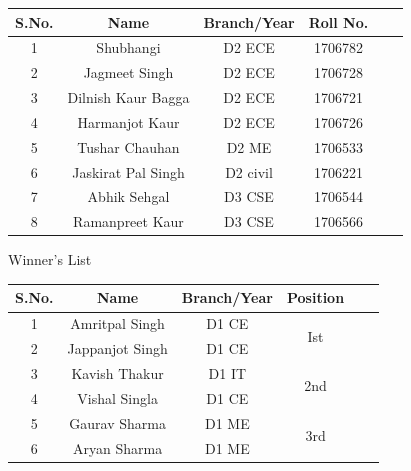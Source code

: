 \documentclass[12pt, a4 paper]{article}
\begin{document}
\begin{table}[h!]
  \begin{center}
    \begin{tabular}{|c|c|c|c|c|c|} 
    \toprule %
      \textbf{S.No.} & \textbf{Name} & \textbf{Branch/Year} & \textbf{Roll No.}\\
      \midrule %
      1 & Shubhangi & D2 ECE & 1706782 \\
      2 & Jagmeet Singh & D2 ECE & 1706728  \\
      3 & Dilnish Kaur Bagga & D2 ECE & 1706721  \\
      4 & Harmanjot Kaur & D2 ECE & 1706726 \\
      5 & Tushar Chauhan & D2 ME & 1706533 \\
      6 & Jaskirat Pal Singh & D2 civil & 1706221  \\
      7 & Abhik Sehgal & D3 CSE & 1706544 \\
      8 & Ramanpreet Kaur & D3 CSE  & 1706566 \\
      \bottomrule %
    \end{tabular}
  \end{center}
\end{table}


\begin{center}
\huge Winner's List
\end{center}

\begin{table}[h!]
  \begin{center}
    \begin{tabular}{|c|c|c|c|c|c|} 
    \toprule %
      \textbf{S.No.} & \textbf{Name} & \textbf{Branch/Year} & \textbf{Position} \\
      \midrule %
      1 & Amritpal Singh  & D1 CE & \multirow{2}{*}{Ist} \\
      2 & Jappanjot Singh & D1 CE \\
      \hline
      3 & Kavish Thakur   & D1 IT & \multirow{2}{*}{2nd} \\
      4 & Vishal Singla   & D1 CE \\
      \hline
      5 & Gaurav Sharma   & D1 ME & \multirow{2}{*}{3rd} \\
      6 & Aryan Sharma    & D1 ME \\
      \bottomrule %
    \end{tabular}
  \end{center}
\end{table}
\end{document}
